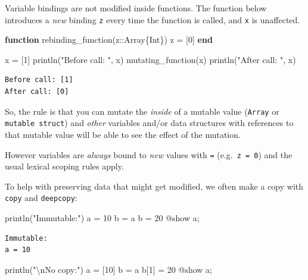 \documentclass[
]{article}
\newenvironment{Shaded}{\begin{snugshade}}{\end{snugshade}}
\newcommand{\DataTypeTok}[1]{\textcolor[rgb]{0.68,0.00,0.00}{#1}}
\newcommand{\FloatTok}[1]{\textcolor[rgb]{0.68,0.00,0.00}{#1}}
\newcommand{\FunctionTok}[1]{\textcolor[rgb]{0.28,0.35,0.67}{#1}}
\newcommand{\KeywordTok}[1]{\textcolor[rgb]{0.00,0.23,0.31}{\textbf{#1}}}
\newcommand{\NormalTok}[1]{\textcolor[rgb]{0.00,0.23,0.31}{#1}}
\newcommand{\OperatorTok}[1]{\textcolor[rgb]{0.37,0.37,0.37}{#1}}
\newcommand{\PreprocessorTok}[1]{\textcolor[rgb]{0.68,0.00,0.00}{#1}}
\newcommand{\SpecialCharTok}[1]{\textcolor[rgb]{0.37,0.37,0.37}{#1}}
\newcommand{\StringTok}[1]{\textcolor[rgb]{0.13,0.47,0.30}{#1}}
\begin{document}
Variable bindings are not modified inside functions. The function below
introduces a \emph{new} binding \texttt{z} every time the function is
called, and \texttt{x} is unaffected.

\begin{Shaded}
\begin{Highlighting}[]
\KeywordTok{function} \FunctionTok{rebinding\_function}\NormalTok{(z}\OperatorTok{::}\DataTypeTok{Array\{Int\}}\NormalTok{) }
\NormalTok{   z }\OperatorTok{=}\NormalTok{ [}\FloatTok{0}\NormalTok{]}
\KeywordTok{end}

\NormalTok{x }\OperatorTok{=}\NormalTok{ [}\FloatTok{1}\NormalTok{]}
\FunctionTok{println}\NormalTok{(}\StringTok{"Before call: "}\NormalTok{, x)}
\FunctionTok{mutating\_function}\NormalTok{(x)}
\FunctionTok{println}\NormalTok{(}\StringTok{"After call: "}\NormalTok{, x)}
\end{Highlighting}
\end{Shaded}

\begin{verbatim}
Before call: [1]
After call: [0]
\end{verbatim}

So, the rule is that you can mutate the \emph{inside} of a mutable value
(\texttt{Array} or \texttt{mutable\ struct}) and \emph{other} variables
and/or data structures with references to that mutable value will be
able to see the effect of the mutation.

However variables are \emph{always} bound to \emph{new} values with
\texttt{=} (e.g.~\texttt{z\ =\ 0}) and the usual lexical scoping rules
apply.

To help with preserving data that might get modified, we often make a
copy with \texttt{copy} and \texttt{deepcopy}:

\begin{Shaded}
\begin{Highlighting}[]
\FunctionTok{println}\NormalTok{(}\StringTok{"Immutable:"}\NormalTok{)}
\NormalTok{a }\OperatorTok{=} \FloatTok{10}
\NormalTok{b }\OperatorTok{=}\NormalTok{ a}
\NormalTok{b }\OperatorTok{=} \FloatTok{20}
\PreprocessorTok{@show}\NormalTok{ a;}
\end{Highlighting}
\end{Shaded}

\begin{verbatim}
Immutable:
a = 10
\end{verbatim}

\begin{Shaded}
\begin{Highlighting}[]
\FunctionTok{println}\NormalTok{(}\StringTok{"}\SpecialCharTok{\textbackslash{}n}\StringTok{No copy:"}\NormalTok{)}
\NormalTok{a }\OperatorTok{=}\NormalTok{ [}\FloatTok{10}\NormalTok{]}
\NormalTok{b }\OperatorTok{=}\NormalTok{ a}
\NormalTok{b[}\FloatTok{1}\NormalTok{] }\OperatorTok{=} \FloatTok{20}
\PreprocessorTok{@show}\NormalTok{ a;}
\end{Highlighting}
\end{Shaded}
\end{document}
